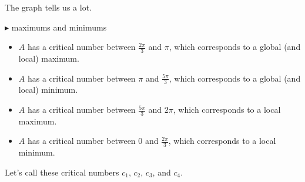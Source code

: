 \documentclass{ximera}
\begin{document}
The graph tells us a lot.







$\blacktriangleright$ maximums and minimums

\begin{itemize}
\item $A$ has a critical number between $\frac{2\pi}{3}$ and $\pi$, which corresponds to a global (and local) maximum.
\item $A$ has a critical number between $\pi$ and $\frac{5\pi}{3}$, which corresponds to a global (and local) minimum.
\item $A$ has a critical number between $\frac{5\pi}{3}$ and $2\pi$, which corresponds to a local maximum.
\item $A$ has a critical number between $0$ and $\frac{2\pi}{3}$, which corresponds to a local minimum.
\end{itemize}


Let's call these critical numbers $c_1$, $c_2$, $c_3$, and $c_4$.
\end{document}
